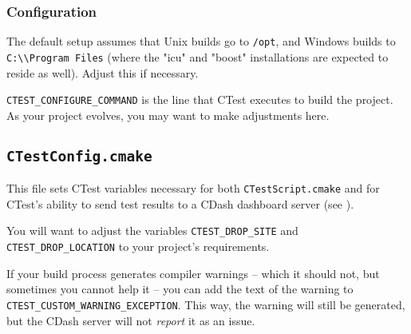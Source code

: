\subsubsection{Configuration}

The default setup assumes that Unix builds go to \lstinline{/opt}, and Windows builds to \lstinline{C:\\Program Files} (where the "icu" and "boost" installations are expected to reside as well). Adjust this if necessary.

\lstinline{CTEST_CONFIGURE_COMMAND} is the line that CTest executes to build the project. As your project evolves, you may want to make adjustments here.

\subsection{\texttt{CTestConfig.cmake}}

This file sets CTest variables necessary for both \lstinline{CTestScript.cmake} and for CTest's ability to send test results to a CDash dashboard server (see ).

You will want to adjust the variables \lstinline{CTEST_DROP_SITE} and \lstinline{CTEST_DROP_LOCATION} to your project's requirements.

If your build process generates compiler warnings -- which it should not, but sometimes you cannot help it -- you can add the text of the warning to \lstinline{CTEST_CUSTOM_WARNING_EXCEPTION}. This way, the warning will still be generated, but the CDash server will not \emph{report} it as an issue.


